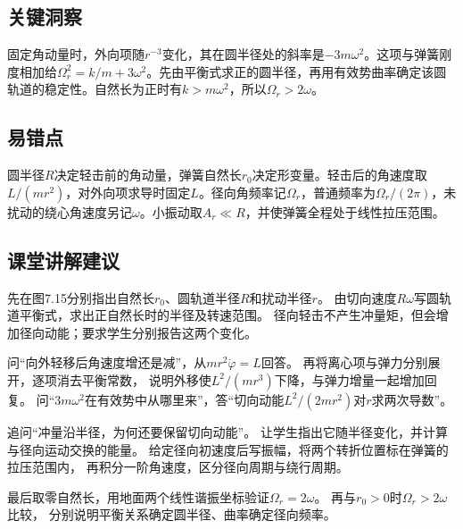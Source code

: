 \documentclass[UTF8,fontset=fandol,a4paper,11pt]{ctexart}
\begin{document}


\subsection*{关键洞察}

固定角动量时，外向项随$r^{-3}$变化，其在圆半径处的斜率是$-3m\omega^2$。这项与弹簧刚度相加给$\Omega_r^2=k/m+3\omega^2$。先由平衡式求正的圆半径，再用有效势曲率确定该圆轨道的稳定性。自然长为正时有$k>m\omega^2$，所以$\Omega_r>2\omega$。




\subsection*{易错点}

圆半径$R$决定轻击前的角动量，弹簧自然长$r_0$决定形变量。轻击后的角速度取$L/(mr^2)$，对外向项求导时固定$L$。径向角频率记$\Omega_r$，普通频率为$\Omega_r/(2\pi)$，未扰动的绕心角速度另记$\omega$。小振动取$A_r\ll R$，并使弹簧全程处于线性拉压范围。




\subsection*{课堂讲解建议}

先在图7.15分别指出自然长$r_0$、圆轨道半径$R$和扰动半径$r$。
由切向速度$R\omega$写圆轨道平衡式，求出正自然长时的半径及转速范围。
径向轻击不产生冲量矩，但会增加径向动能；要求学生分别报告这两个变化。

问“向外轻移后角速度增还是减”，从$mr^2\dot\varphi=L$回答。
再将离心项与弹力分别展开，逐项消去平衡常数，
说明外移使$L^2/(mr^3)$下降，与弹力增量一起增加回复。
问“$3m\omega^2$在有效势中从哪里来”，答“切向动能$L^2/(2mr^2)$对$r$求两次导数”。

追问“冲量沿半径，为何还要保留切向动能”。
让学生指出它随半径变化，并计算与径向运动交换的能量。
给定径向初速度后写振幅，将两个转折位置标在弹簧的拉压范围内，
再积分一阶角速度，区分径向周期与绕行周期。

最后取零自然长，用地面两个线性谐振坐标验证$\Omega_r=2\omega$。
再与$r_0>0$时$\Omega_r>2\omega$比较，
分别说明平衡关系确定圆半径、曲率确定径向频率。
\end{document}
